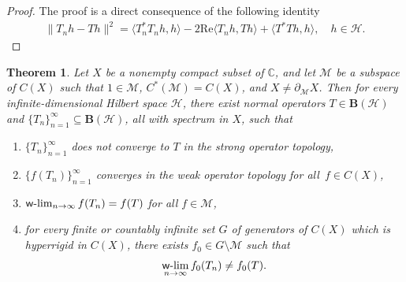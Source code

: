 \documentclass[reqno]{amsproc}
\numberwithin{equation}{section}
\newtheorem{theorem}{Theorem}[section]
\theoremstyle{remark}
\newcommand*{\hh}{\mathcal{H}}
\newcommand*{\is}[2]{\langle#1,#2\rangle}
\newcommand*{\mcal}{\mathcal{M}}
\newcommand*{\comp}{\mathbb{C}}
\newcommand*{\bou}{\boldsymbol{B}}
\newcommand*{\cbb}{\comp}
\theoremstyle{definition}
\def\wwlim{\qopname\relax m{{\sf{w}\textrm-}lim}}
\begin{document}
   \begin{proof} The proof is a direct
consequence of the following identity
   \begin{align} \tag*{\qedhere}
\|T_n h- Th\|^2 = \is{T_n^*T_n h}{h} - 2
\mathrm{Re} \is{T_nh}{Th} + \is{T^*Th}{h},
\quad h\in \hh.
   \end{align}
   \end{proof}
   \begin{theorem} \label{main2}
Let $X$ be a nonempty compact subset of $\cbb$, and
let $\mathcal{M}$ be a subspace of $C(X)$ such that
$1\in \mathcal{M}$, $C^*(\mcal)=C(X)$, and $X \neq
\partial_\mathcal{M}X$. Then for every
infinite-dimensional Hilbert space $\hh$, there exist
normal operators $T\in \bou(\hh)$ and
$\{T_n\}_{n=1}^{\infty}\subseteq \bou(\hh)$, all with
spectrum in $X$, such that
   \begin{enumerate}
   \item[(i)] $\{T_n\}_{n=1}^{\infty}$ does not
converge to $T$ in the strong operator topology,
   \item[(ii)] $\{f(T_n)\}_{n=1}^{\infty}$
converges in the weak operator topology for all~$f\in
C(X)$,
   \item[(iii)] $\wwlim_{n\to\infty} f(T_n) = f(T)$
for all $f\in \mcal$,
   \item[(iv)]
for every finite or countably infinite set $G$ of
generators of $C(X)$ which is hyperrigid in $C(X)$,
there exists $f_0\in G \setminus \mcal$ such that
   \begin{align*}
\wwlim_{n\to\infty} f_0(T_n) \neq f_0(T).
   \end{align*}
   \end{enumerate}
   \end{theorem}
\end{document}
